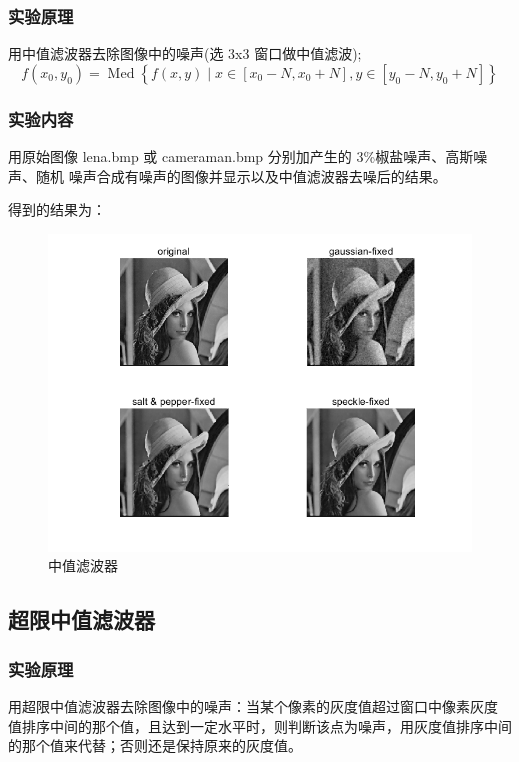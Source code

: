 \documentclass{ctexart}
\begin{document}
\subsubsection{\hei 实验原理}
用中值滤波器去除图像中的噪声(选 3x3 窗口做中值滤波);
$$f\left(x_{0}, y_{0}\right)=\operatorname{Med}\left\{f(x, y) \mid x \in\left[x_{0}-N, x_{0}+N\right], y \in\left[y_{0}-N, y_{0}+N\right]\right\}$$
\subsubsection{\hei 实验内容}
用原始图像 lena.bmp 或 cameraman.bmp 分别加产生的 3\%椒盐噪声、高斯噪声、随机
噪声合成有噪声的图像并显示以及中值滤波器去噪后的结果。
\par 得到的结果为：
\begin{figure}[H]
    \centering
    \includegraphics[scale=0.35]{3_3.png}
    \caption{中值滤波器}
\end{figure}
\subsection{\hei 超限中值滤波器}
\subsubsection{\hei 实验原理}
用超限中值滤波器去除图像中的噪声：当某个像素的灰度值超过窗口中像素灰度
值排序中间的那个值，且达到一定水平时，则判断该点为噪声，用灰度值排序中间
的那个值来代替；否则还是保持原来的灰度值。
\end{document}
